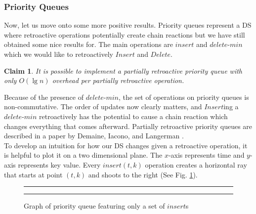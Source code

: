 \documentclass[11pt]{article}
\newtheorem{claim}[theorem]{Claim}
\begin{document}
\subsubsection{Priority Queues}
Now, let us move onto some more positive results.  Priority queues represent a DS where retroactive operations potentially create chain reactions but we have still obtained some nice results for.  The main operations are $insert$ and $delete$-$min$ which we would like to retroactively $Insert$ and $Delete$.

\begin{claim}
	It is possible to implement a partially retroactive priority queue with only $O(\lg n)$ overhead per partially retroactive operation.
\end{claim}

Because of the presence of $delete$-$min$, the set of operations on priority queues is non-commutative.  The order of updates now clearly matters, and $Insert$ing a $delete$-$min$ retroactively has the potential to cause a chain reaction which changes everything that comes afterward. Partially retroactive priority queues are described in a paper by Demaine, Iacono, and Langerman \cite{dil}. \\

To develop an intuition for how our DS changes given a retroactive operation, it is helpful to plot it on a two dimensional plane.  The $x$-axis represents time and $y$-axis represents key value. Every $insert(t,k)$ operation creates a horizontal ray that starts at point $(t,k)$ and shoots to the right (See Fig. \ref{fig-pqinsert}).

\begin{figure}[ht]
	\rule{\textwidth}{0.005in}
  \begin{center}
  \end{center}

  \caption{\small Graph of priority queue featuring only a set of $insert$s}
  \label{fig-pqinsert}
	\rule{\textwidth}{0.005in}
\end{figure}
\end{document}
